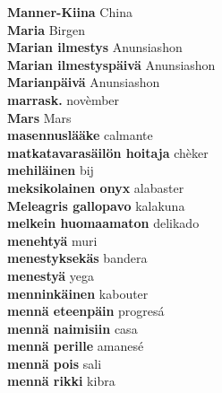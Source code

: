 \textbf{ Manner-Kiina  } China \\
\textbf{ Maria  } Birgen \\
\textbf{ Marian ilmestys  } Anunsiashon \\
\textbf{ Marian ilmestyspäivä  } Anunsiashon \\
\textbf{ Marianpäivä  } Anunsiashon \\
\textbf{ marrask.  } novèmber \\
\textbf{ Mars  } Mars \\
\textbf{ masennuslääke  } calmante \\
\textbf{ matkatavarasäilön hoitaja  } chèker \\
\textbf{ mehiläinen  } bij \\
\textbf{ meksikolainen onyx  } alabaster \\
\textbf{ Meleagris gallopavo  } kalakuna \\
\textbf{ melkein huomaamaton  } delikado \\
\textbf{ menehtyä  } muri \\
\textbf{ menestyksekäs  } bandera \\
\textbf{ menestyä  } yega \\
\textbf{ menninkäinen  } kabouter \\
\textbf{ mennä eteenpäin  } progresá \\
\textbf{ mennä naimisiin  } casa \\
\textbf{ mennä perille  } amanesé \\
\textbf{ mennä pois  } sali \\
\textbf{ mennä rikki  } kibra \\
